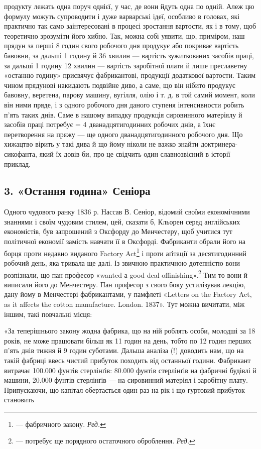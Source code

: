 \parcont{}  %
продукту лежать одна поруч однієї, у час, де вони йдуть одна по одній. Алеж цю формулу можуть
супроводити і дуже варварські ідеї, особливо в головах, які практично так само заінтересовані
в процесі зростання вартости, як і в тому, щоб теоретично зрозуміти його хибно. Так, можна собі
уявити, що, приміром, наш прядун за перші 8 годин свого робочого дня продукує або покриває вартість
бавовни, за дальші 1 годину й 36 хвилин — вартість зужиткованих засобів праці, за дальші 1 годину 12
хвилин — вартість заробітної плати й лише преславетну «останню
годину» присвячує фабрикантові, продукції додаткової вартости. Таким чином прядунові накидають
подвійне диво, а саме, що він нібито продукує бавовну, веретена, парову машину, вугілля,
олію і т. д. в той самий момент, коли він ними пряде, і з одного робочого дня даного ступеня
інтенсивности робить п’ять
таких днів. Саме в нашому випадку продукція сировинного матеріялу й засобів праці потребує  = 4
дванадцятигодинних робочих днів, а їхнє перетворення на пряжу — ще одного дванадцятигодинного
робочого дня. Що хижацтво вірить у такі дива й що йому ніколи не важко знайти доктринера-сикофанта,
який їх довів би, про це свідчить один славнозвісний в історії приклад.

\subsection*{3. «Остання година» Сеніора}
Одного чудового ранку 1836 р. Нассав В. Сеніор, відомий своїми економічними знаннями і своїм чудовим
стилем, цей, сказати б, Кльорен серед англійських економістів, був запрошений
з Оксфорду до Менчестеру, щоб учитися тут політичної економії замість навчати її в Оксфорді.
Фабриканти обрали його на борця проти недавно виданого Factory Act\footnote*{
— фабричного закону. \emph{Ред.}
} і проти аґітації за
десятигодинний
робочий день, яка тривала ще далі. Із звичною практичною дотепністю вони розпізнали, що пан професор
«wanted а
good deal offinishing».\footnote*{
— потребує ще порядного остаточного оброблення. \emph{Ред.}
} Тим то вони й виписали його до Менчестеру. Пан професор з свого боку
устилізував лекцію, дану йому в Менчестері фабрикантами, у памфлеті «Letters on the Factory Act, as
it affects the cotton manufacture. London. 1837». Тут можна вичитати, між іншим, такі повчальні
місця:

«За теперішнього закону жодна фабрика, що на ній роблять особи, молодші за 18 років, не може
працювати більш як 11 годин на день, тобто по 12 годин перших п’ять днів тижня й 9 годин
суботами. Дальша аналіза (!) доводить нам, що на такій фабриці ввесь чистий прибуток походить від
останньої години. Фабрикант
витрачає 100.000 фунтів стерлінґів: 80.000 фунтів стерлінґів на фабричні будівлі й машини, 20.000
фунтів стерлінґів — на сировинний матеріял і заробітну плату. Припускаючи, що капітал обертається
один раз на рік і що гуртовий прибуток становить
\parbreak{}  %

